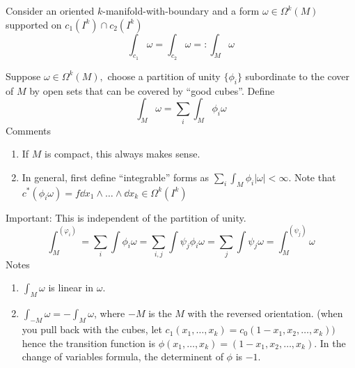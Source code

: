 \documentclass{exam}
\begin{document}
    \begin{proposition}
        Consider an oriented $k$-manifold-with-boundary and a form $\omega\in\Omega^k(M)$ supported on $c_1(I^k)\cap c_2(I^k)$
        \begin{equation}
            \int_{c_1}\omega=\int_{c_2}\omega=:\int_M\omega
        \end{equation}
    \end{proposition}
    Suppose $\omega\in\Omega^k(M),$ choose a partition of unity $\{\phi_i\}$ subordinate to the cover of $M$ by open sets that can be covered by ``good cubes''.
    Define \begin{equation}
        \int_M\omega=\sum_i\int_M\phi_i\omega
    \end{equation}
    Comments
    \begin{enumerate}
        \item If $M$ is compact, this always makes sense.
        \item In general, first define ``integrable'' forms as $\sum_i\int_M\phi_i|\omega|<\infty$. Note that $c^*(\phi_i\omega)=f\dd x_1\wedge\dots\wedge\dd x_k\in\Omega^k(I^k)$
    \end{enumerate}
    Important: This is independent of the partition of unity.
    \begin{equation}
        \int_M^{(\varphi_i)}=\sum_i\int\phi_i\omega=\sum_{i,j}\int\psi_j\phi_i\omega=\sum_j\int\psi_j\omega=\int_M^{(\psi_j)}\omega
    \end{equation}
    Notes
    \begin{enumerate}
        \item $\int_M\omega$ is linear in $\omega$.
        \item $\int_{-M}\omega=-\int_M\omega$, where $-M$ is the $M$ with the reversed orientation. (when you pull back with the cubes, let $c_1(x_1,\dots,x_k)=c_0(1-x_1,x_2,\dots,x_k))$ hence the transition function is $\phi(x_1,\dots,x_k)=(1-x_1,x_2,\dots,x_k)$. In the change of variables formula, the determinent of $\phi$ is $-1$.
    \end{enumerate}
    
\end{document}
